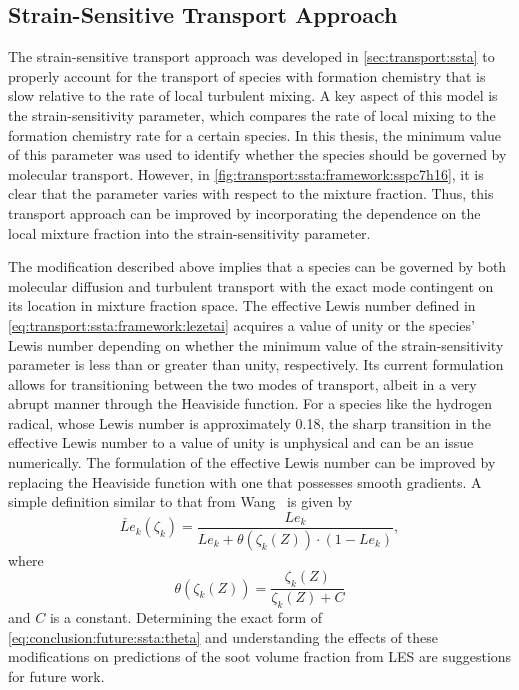 \subsection{Strain-Sensitive Transport Approach}
\label{sec:conclusion:future:ssta}

The strain-sensitive transport approach was developed in \cref{sec:transport:ssta} to properly account for the transport of species with formation chemistry that is slow relative to the rate of local turbulent mixing. A key aspect of this model is the strain-sensitivity parameter, which compares the rate of local mixing to the formation chemistry rate for a certain species. In this thesis, the minimum value of this parameter was used to identify whether the species should be governed by molecular transport. However, in \cref{fig:transport:ssta:framework:sspc7h16}, it is clear that the parameter varies with respect to the mixture fraction. Thus, this transport approach can be improved by incorporating the dependence on the local mixture fraction into the strain-sensitivity parameter.

The modification described above implies that a species can be governed by both molecular diffusion and turbulent transport with the exact mode contingent on its location in mixture fraction space. The effective Lewis number defined in \cref{eq:transport:ssta:framework:lezetai} acquires a value of unity or the species' Lewis number depending on whether the minimum value of the strain-sensitivity parameter is less than or greater than unity, respectively. Its current formulation allows for transitioning between the two modes of transport, albeit in a very abrupt manner through the Heaviside function. For a species like the hydrogen radical, whose Lewis number is approximately 0.18, the sharp transition in the effective Lewis number to a value of unity is unphysical and can be an issue numerically. The formulation of the effective Lewis number can be improved by replacing the Heaviside function with one that possesses smooth gradients. A simple definition similar to that from Wang~\cite{wang2016} is given by
\begin{equation}\label{eq:conclusion:future:ssta:lezetai}
  \check{Le}_k(\zeta_k) = \frac{Le_k}{Le_k + \theta(\zeta_k(Z)) \cdot (1 - Le_k)},
\end{equation}
where
\begin{equation}\label{eq:conclusion:future:ssta:theta}
  \theta(\zeta_k(Z)) = \frac{\zeta_k(Z)}{\zeta_k(Z) + C}
\end{equation}
and $C$ is a constant. Determining the exact form of \cref{eq:conclusion:future:ssta:theta} and understanding the effects of these modifications on predictions of the soot volume fraction from LES are suggestions for future work.

